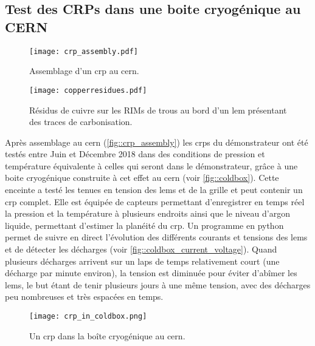     \subsection{Test des CRPs dans une boite cryogénique au CERN}\label{sec::cold_box}
      
      \begin{figure}
        \centering
        \texttt{[image: crp\_assembly.pdf]}
        \caption[Assemblage d'un CRP au CERN]{\label{fig::crp_assembly}Assemblage d'un \gls{crp} au \gls{cern}.}
      \end{figure}
      
      \begin{figure}
        \centering
        \texttt{[image: copperresidues.pdf]}
        \caption[Résidus de cuivre sur certains RIMs]{\label{fig::copperresidues}Résidus de cuivre sur les RIMs de trous au bord d'un \gls{lem} présentant des traces de carbonisation.}
      \end{figure}

      Après assemblage au \gls{cern} (\autoref{fig::crp_assembly}) les  \glspl{crp} du démonstrateur \SSS{} ont été testés entre Juin et Décembre 2018 dans des conditions de pression et température équivalente à celles qui seront dans le démonstrateur, grâce à une boite cryogénique construite à cet effet au \gls{cern} (voir \autoref{fig::coldbox}). Cette enceinte a testé les tenues en tension des \glspl{lem} et de la grille et peut contenir un \gls{crp} complet. Elle est équipée de capteurs permettant d'enregistrer en temps réel la pression et la température à plusieurs endroits ainsi que le niveau d'argon liquide, permettant d'estimer la planéité du \gls{crp}. 
      Un programme en python permet de suivre en direct l'évolution des différents courants et tensions des \glspl{lem} et de détecter les décharges (voir \autoref{fig::coldbox_current_voltage}). Quand plusieurs décharges arrivent sur un laps de temps relativement court (une décharge par minute environ), la tension est diminuée pour éviter d'abîmer les \glspl{lem}, le but étant de tenir plusieurs jours à une même tension, avec des décharges peu nombreuses et très espacées en temps.

      \begin{figure}[htpb]
        \centering
        \texttt{[image: crp\_in\_coldbox.png]}
        \caption[Un CRP dans la boîte cryogénique au CERN]{\label{fig::coldbox}Un \gls{crp} dans la boîte cryogénique au \gls{cern}.}
      \end{figure}

